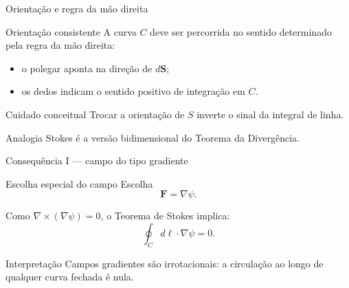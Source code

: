 \documentclass[aspectratio=169]{beamer}
\newcommand{\blue}[1]{\textcolor{myblue}{#1}}
\newcommand{\red}[1]{\textcolor{myred}{#1}}
\begin{document}
\begin{frame}{Orientação e regra da mão direita}
\begin{block}{Orientação consistente}
A curva $C$ deve ser percorrida no sentido
determinado pela \blue{regra da mão direita}:
\end{block}

\begin{itemize}
  \item o polegar aponta na direção de $d\bm S$;
  \item os dedos indicam o sentido positivo de integração em $C$.
\end{itemize}

\begin{alertblock}{Cuidado conceitual}
Trocar a orientação de $S$ inverte o sinal da integral de linha.
\end{alertblock}

\begin{block}{Analogia}
Stokes é a versão bidimensional do Teorema da Divergência.
\end{block}
\end{frame}

\begin{frame}{Consequência I — campo do tipo gradiente}
\begin{block}{Escolha especial do campo}
Escolha
\[
\bm F = \nabla\psi.
\]
\end{block}

Como $\nabla\times(\nabla\psi)=0$, o Teorema de Stokes
implica:
\begin{equation}
\oint_C d\bm \ell\cdot\nabla\psi = 0.
\tag{1.84}
\label{eq:grad_circulation}
\end{equation}

\begin{alertblock}{Interpretação}
Campos gradientes são \red{irrotacionais}:
a circulação ao longo de qualquer curva fechada é nula.
\end{alertblock}
\end{frame}
\end{document}
